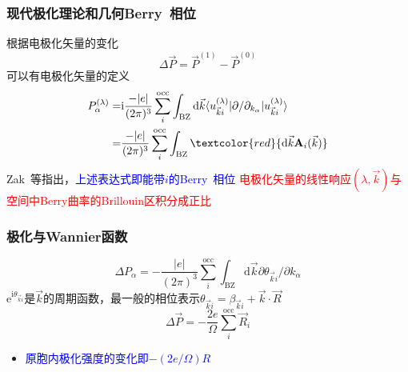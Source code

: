 {\frame
{
	\frametitle{现代极化理论和几何\textrm{Berry~}相位}
	根据电极化矢量的变化
	\begin{displaymath}
		\Delta\vec P=\vec P^{(1)}-\vec P^{(0)}	
	\end{displaymath}
	可以有电极化矢量的定义
	\begin{displaymath}
		\begin{aligned}
			P_{\alpha}^{(\lambda)}=&\mathrm{i}\frac{-|e|}{(2\pi)^3}\sum_i^{\mathrm{occ}}\int_{\mathrm{BZ}}\mathrm{d}\vec k\langle u_{\vec k i}^{(\lambda)}|\partial/\partial_{k_{\alpha}}|u_{\vec k i}^{(\lambda)}\rangle\\
			=&\frac{-|e|}{(2\pi)^3}\sum_i^{\mathrm{occ}}\int_{\mathrm{BZ}}\textcolor{red}{\mathrm{d}\vec k\mathbf{A}_i(\vec k)}
		\end{aligned}
	\end{displaymath}
	\textrm{Zak~}等指出，\textcolor{blue}{上述表达式即能带$i$的\textrm{Berry~}相位}%
\vskip 8pt
	\textcolor{red}{电极化矢量的线性响应$(\lambda,\vec k)$与空间中\textrm{Berry}曲率的\textrm{Brillouin}区积分成正比}
}


\frame
{
	\frametitle{极化与\textrm{Wannier}函数}
	\begin{displaymath}
		\Delta P_{\alpha}=-\frac{|e|}{(2\pi)^3}\sum_i^{\mathrm{occ}}\int_{\mathrm{BZ}}\mathrm{d}\vec k\partial\theta_{\vec k i}/\partial k_{\alpha}
	\end{displaymath}
	$\mathrm{e}^{\mathrm{i}\theta_{\vec k i}}$是$\vec k$的周期函数，最一般的相位表示$\theta_{\vec k i}=\beta_{\vec k i}+\vec k\cdot\vec R$
	\begin{displaymath}
		\Delta\vec P=-\frac{2e}{\Omega}\sum_i^{\mathrm{occ}}\vec R_i
	\end{displaymath}
	\textcolor{red}{\fontsize{9.0pt}{6.2pt}}
	\begin{itemize}
		\item \textcolor{blue}{原胞内极化强度的变化即$-(2e/\Omega)R$}
	\end{itemize}
}

}
